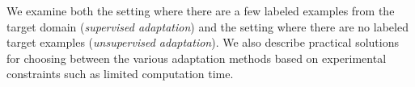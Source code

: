 We examine both the setting where there are a few labeled examples
from the target domain (\emph{supervised adaptation}) and the setting
where there are no labeled target examples (\emph{unsupervised
adaptation}). We also describe practical solutions for choosing
between the various adaptation methods based on experimental
constraints such as limited computation time.

